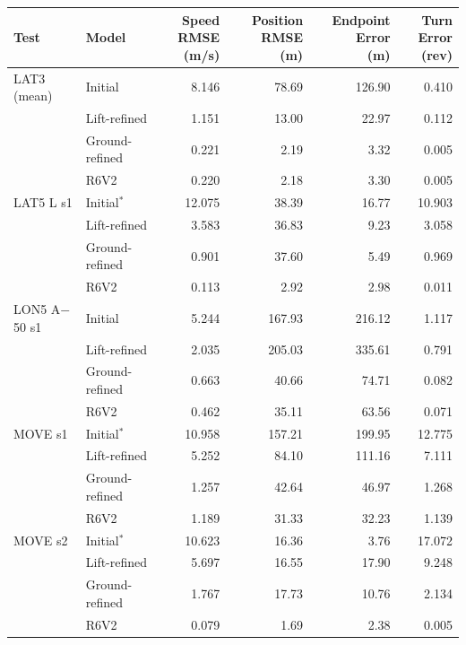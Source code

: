 \begin{center}
\small
\setlength{\tabcolsep}{5pt}
\begin{tabular}{@{}llrrrr@{}}
\toprule
Test & Model & \shortstack{Speed RMSE\\(m/s)} & \shortstack{Position RMSE\\(m)} & \shortstack{Endpoint Error\\(m)} & \shortstack{Turn Error\\(rev)} \\
\midrule
LAT3 (mean) & Initial & 8.146 & 78.69 & 126.90 & 0.410 \\
 & Lift-refined & 1.151 & 13.00 & 22.97 & 0.112 \\
 & Ground-refined & 0.221 & 2.19 & 3.32 & 0.005 \\
 & R6V2 & 0.220 & 2.18 & 3.30 & 0.005 \\
\addlinespace[2pt]
LAT5 L s1 & Initial$^{*}$ & 12.075 & 38.39 & 16.77 & 10.903 \\
 & Lift-refined & 3.583 & 36.83 & 9.23 & 3.058 \\
 & Ground-refined & 0.901 & 37.60 & 5.49 & 0.969 \\
 & R6V2 & 0.113 & 2.92 & 2.98 & 0.011 \\
\addlinespace[2pt]
LON5 A$-$ 50 s1 & Initial & 5.244 & 167.93 & 216.12 & 1.117 \\
 & Lift-refined & 2.035 & 205.03 & 335.61 & 0.791 \\
 & Ground-refined & 0.663 & 40.66 & 74.71 & 0.082 \\
 & R6V2 & 0.462 & 35.11 & 63.56 & 0.071 \\
\addlinespace[2pt]
MOVE s1 & Initial$^{*}$ & 10.958 & 157.21 & 199.95 & 12.775 \\
 & Lift-refined & 5.252 & 84.10 & 111.16 & 7.111 \\
 & Ground-refined & 1.257 & 42.64 & 46.97 & 1.268 \\
 & R6V2 & 1.189 & 31.33 & 32.23 & 1.139 \\
\addlinespace[2pt]
MOVE s2 & Initial$^{*}$ & 10.623 & 16.36 & 3.76 & 17.072 \\
 & Lift-refined & 5.697 & 16.55 & 17.90 & 9.248 \\
 & Ground-refined & 1.767 & 17.73 & 10.76 & 2.134 \\
 & R6V2 & 0.079 & 1.69 & 2.38 & 0.005 \\
\bottomrule
\end{tabular}
\label{tab:additional_summary}
\end{center}
